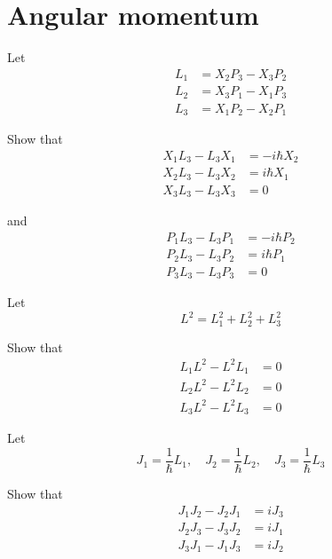 

\section*{Angular momentum}

Let
\begin{align*}
L_1&=X_2P_3-X_3P_2
\\
L_2&=X_3P_1-X_1P_3
\\
L_3&=X_1P_2-X_2P_1
\end{align*}

Show that
\begin{align*}
X_1L_3-L_3X_1&=-i\hbar X_2
\\
X_2L_3-L_3X_2&=i\hbar X_1
\\
X_3L_3-L_3X_3&=0
\end{align*}

and
\begin{align*}
P_1L_3-L_3P_1&=-i\hbar P_2
\\
P_2L_3-L_3P_2&=i\hbar P_1
\\
P_3L_3-L_3P_3&=0
\end{align*}

Let
\begin{equation*}
L^2=L_1^2+L_2^2+L_3^2
\end{equation*}

Show that
\begin{align*}
L_1L^2-L^2L_1&=0
\\
L_2L^2-L^2L_2&=0
\\
L_3L^2-L^2L_3&=0
\end{align*}

Let
\begin{equation*}
J_1=\frac{1}{\hbar}L_1,\quad J_2=\frac{1}{\hbar}L_2,\quad J_3=\frac{1}{\hbar}L_3
\end{equation*}

Show that
\begin{align*}
J_1J_2-J_2J_1&=iJ_3
\\
J_2J_3-J_3J_2&=iJ_1
\\
J_3J_1-J_1J_3&=iJ_2
\end{align*}


